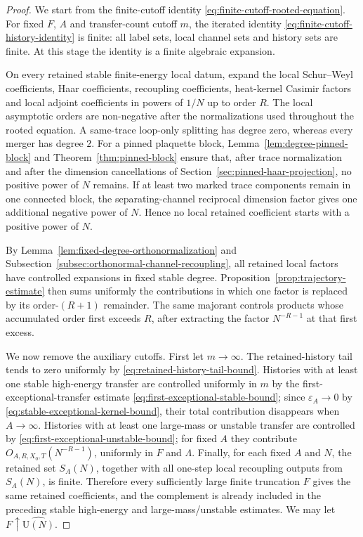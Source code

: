 \documentclass[11pt,a4paper,reqno]{amsart}
\theoremstyle{definition}
\theoremstyle{remark}
\newcommand\U{{\mathrm U}}
\begin{document}
\begin{proof}
We start from the finite-cutoff identity \eqref{eq:finite-cutoff-rooted-equation}.  For fixed $F$, $A$ and transfer-count cutoff $m$, the iterated identity \eqref{eq:finite-cutoff-history-identity} is finite: all label sets, local channel sets and history sets are finite.  At this stage the identity is a finite algebraic expansion.

On every retained stable finite-energy local datum, expand the local Schur--Weyl coefficients, Haar coefficients, recoupling coefficients, heat-kernel Casimir factors and local adjoint coefficients in powers of $1/N$ up to order $R$.  The local asymptotic orders are non-negative after the normalizations used throughout the rooted equation.  A same-trace loop-only splitting has degree zero, whereas every merger has degree $2$. For a pinned plaquette block, Lemma~\ref{lem:degree-pinned-block} and Theorem~\ref{thm:pinned-block} ensure that, after trace normalization and after the dimension cancellations of Section~\ref{sec:pinned-haar-projection}, no positive power of $N$ remains.  If at least two marked trace components remain in one connected block, the separating-channel reciprocal dimension factor gives one additional negative power of $N$.  Hence no local retained coefficient starts with a positive power of $N$.

By Lemma~\ref{lem:fixed-degree-orthonormalization} and Subsection~\ref{subsec:orthonormal-channel-recoupling}, all retained local factors have controlled expansions in fixed stable degree. Proposition~\ref{prop:trajectory-estimate} then sums uniformly the contributions in which one factor is replaced by its order-$(R+1)$ remainder. The same majorant controls products whose accumulated order first exceeds $R$, after extracting the factor $N^{-R-1}$ at that first excess.

We now remove the auxiliary cutoffs.  First let $m\to\infty$.  The retained-history tail tends to zero uniformly by \eqref{eq:retained-history-tail-bound}.  Histories with at least one stable high-energy transfer are controlled uniformly in $m$ by the first-exceptional-transfer estimate \eqref{eq:first-exceptional-stable-bound}; since $\varepsilon_A\to0$ by \eqref{eq:stable-exceptional-kernel-bound}, their total contribution disappears when $A\to\infty$.  Histories with at least one large-mass or unstable transfer are controlled by \eqref{eq:first-exceptional-unstable-bound}; for fixed $A$ they contribute $O_{A,R,X_0,T}(N^{-R-1})$, uniformly in $F$ and $\Lambda$.  Finally, for each fixed $A$ and $N$, the retained set $S_A(N)$, together with all one-step local recoupling outputs from $S_A(N)$, is finite.  Therefore every sufficiently large finite truncation $F$ gives the same retained coefficients, and the complement is already included in the preceding stable high-energy and large-mass/unstable estimates.  We may let $F\uparrow\widehat{\U(N)}$.


\end{proof}
\end{document}
